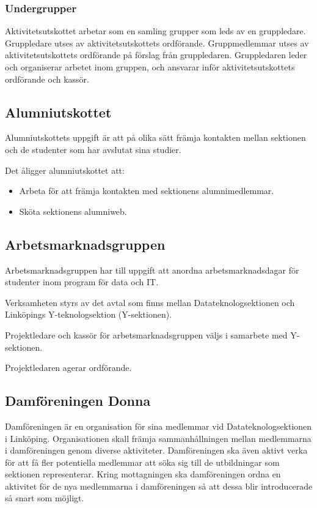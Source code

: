 \documentclass{datateknologsektionen-document}
\begin{document}
\subsubsection{Undergrupper}
Aktivitetsutskottet arbetar som en samling grupper som leds av en gruppledare.
Gruppledare utses av aktivitetsutskottets ordförande. Gruppmedlemmar utses av
aktivitetsutskottets ordförande på förslag från gruppledaren. Gruppledaren leder och
organiserar arbetet inom gruppen, och ansvarar inför aktivitetsutskottets
ordförande och kassör.

\subsection{Alumniutskottet}
Alumniutskottets uppgift är att på olika sätt främja kontakten mellan sektionen
och de studenter som har avslutat sina studier.

Det åligger alumniutskottet att:
\begin{itemize}
  \item Arbeta för att främja kontakten med sektionens alumnimedlemmar.
  \item Sköta sektionens alumniweb.
\end{itemize}

\subsection{Arbetsmarknadsgruppen}
\label{arbetsmarknadsgruppen}
Arbetsmarknadsgruppen har till uppgift att anordna arbetsmarknadsdagar för studenter
inom program för data och IT.

Verksamheten styrs av det avtal som finns mellan Datateknologsektionen och Linköpings
Y-teknologsektion (Y-sektionen).

Projektledare och kassör för arbetsmarknadsgruppen väljs i samarbete med Y-sektionen.

Projektledaren agerar ordförande.

\subsection{Damföreningen Donna}
Damföreningen är en organisation för sina medlemmar vid Datateknologsektionen i Linköping.
Organisationen skall främja sammanhållningen mellan medlemmarna i damföreningen genom
diverse aktiviteter. Damföreningen ska även aktivt verka för att få fler potentiella
medlemmar att söka sig till de utbildningar som sektionen representerar. Kring
mottagningen ska damföreningen ordna en aktivitet för de nya medlemmarna i damföreningen
så att dessa blir introducerade så snart som möjligt.
\end{document}
